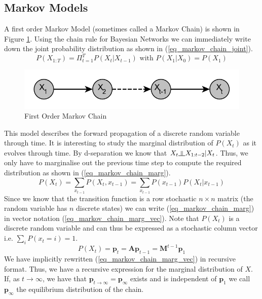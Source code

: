 \documentclass[../masters.tex]{subfiles}
\begin{document}
\subsection{Markov Models}
A first order Markov Model (sometimes called a Markov Chain) is shown in Figure \ref{fig_markov_chain}. Using the chain rule for Bayesian Networks we can immediately write down the joint probability distribution as shown in (\ref{eq_markov_chain_joint}).
\begin{equation}
P(X_{1:T}) = \Pi_{t=1}^T P(X_t|X_{t-1}) \text{ with } P(X_1|X_{0}) = P(X_1)
\label{eq_markov_chain_joint}
\end{equation}  
\begin{figure}[H] 
\centering
\includegraphics[scale=1.0]{markov_chain.pdf}
\caption{First Order Markov Chain}
\label{fig_markov_chain}
\end{figure}
This model describes the forward propagation of a discrete random variable through time. It is interesting to study the marginal distribution of $P(X_t)$ as it evolves through time. By d-separation we know that $X_t \indep X_{1:t-2} | X_t$. Thus, we only have to marginalise out the previous time step to compute the required distribution as shown in (\ref{eq_markov_chain_marg}).
\begin{equation}
P(X_t) = \sum_{x_{t-1}} P(X_t, x_{t-1}) = \sum_{x_{t-1}} P(x_{t-1})P(X_t|x_{t-1})
\label{eq_markov_chain_marg}
\end{equation}
Since we know that the transition function is a row stochastic $n \times n$ matrix (the random variable has $n$ discrete states) we can write (\ref{eq_markov_chain_marg}) in vector notation (\ref{eq_markov_chain_marg_vec}). Note that $P(X_t)$ is a discrete random variable and can thus be expressed as a stochastic column vector i.e. $\sum_i P(x_t=i) = 1$.
\begin{equation}
P(X_t) = \mathbf{p}_t = \mathbf{A}\mathbf{p}_{t-1} = \mathbf{M}^{t-1}\mathbf{p}_1
\label{eq_markov_chain_marg_vec}
\end{equation}
We have implicitly rewritten (\ref{eq_markov_chain_marg_vec}) in recursive format. Thus, we have a recursive expression for the marginal distribution of $X$. If, as $t \rightarrow \infty$, we have that $\mathbf{p}_{t \rightarrow \infty} = \mathbf{p}_{\infty}$ exists and is independent of $\mathbf{p}_1$ we call $\mathbf{p}_{\infty}$ the equilibrium distribution of the chain. 
\end{document}

